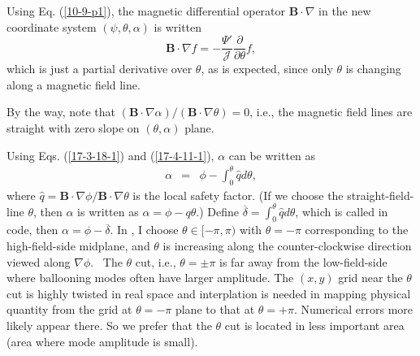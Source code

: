 \documentclass{llncs}
\newcommand{\tmtexttt}[1]{\text{{\ttfamily{#1}}}}
\begin{document}
Using Eq. (\ref{10-9-p1}), the magnetic differential operator $\mathbf{B}
\cdot \nabla$ in the new coordinate system $(\psi, \theta, \alpha)$ is written
\begin{equation}
  \label{10-25-e1} \mathbf{B} \cdot \nabla f = - \frac{\Psi'}{\mathcal{J}}
  \frac{\partial}{\partial \theta} f,
\end{equation}
which is just a partial derivative over $\theta$, as is expected, since only
$\theta$ is changing along a magnetic field line.

By the way, note that $(\mathbf{B} \cdot \nabla \alpha) / (\mathbf{B} \cdot
\nabla \theta) = 0$, i.e., the magnetic field lines are straight with zero
slope on $(\theta, \alpha)$ plane.

Using Eqs. (\ref{17-3-18-1}) and (\ref{17-4-11-1}), $\alpha$ can be written as
\begin{eqnarray}
  \alpha & = & \phi - \int_0^{\theta} \hat{q} d \theta,  \label{17-9-15-1}
\end{eqnarray}
where $\hat{q} =\mathbf{B} \cdot \nabla \phi /\mathbf{B} \cdot \nabla \theta$
is the local safety factor. (If we choose the straight-field-line $\theta$,
then $\alpha$ is written as $\alpha = \phi - q \theta$.) Define
$\overline{\delta} = \int_0^{\theta} \hat{q} d \theta$, which is called
\tmtexttt{tor\_shift} in \tmtexttt{TEK} code, then $\alpha = \phi -
\overline{\delta}$. In \tmtexttt{TEK}, I choose $\theta \in [- \pi, \pi)$ with
$\theta = - \pi$ corresponding to the high-field-side midplane, and $\theta$
is increasing along the counter-clockwise direction viewed along $\nabla
\phi$. \ The $\theta$ cut, i.e., $\theta = \pm \pi$ is far away from the
low-field-side where ballooning modes often have larger amplitude. The $(x,
y)$ grid near the $\theta$ cut is highly twisted in real space and
interplation is needed in mapping physical quantity from the grid at $\theta =
- \pi$ plane to that at $\theta = + \pi$. Numerical errors more likely appear
there. So we prefer that the $\theta$ cut is located in less important area
(area where mode amplitude is small).
\end{document}
